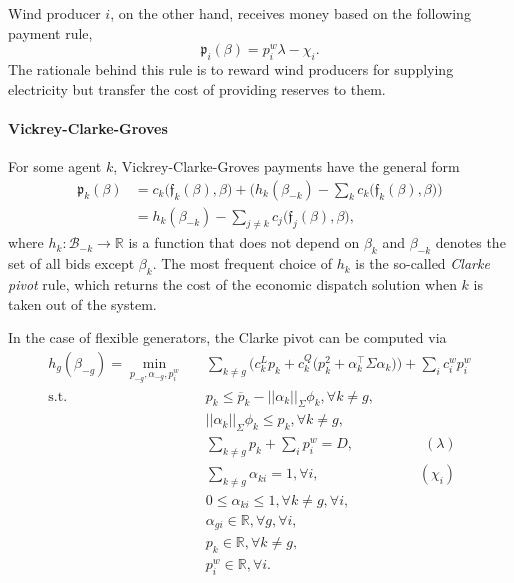 \documentclass{article}
\begin{document}
Wind producer $i$, on the other hand, receives money based on the following payment rule,
\begin{equation*}
\mathfrak{p}_i(\beta) = p_i^w \lambda - \chi_i.
\end{equation*}
The rationale behind this rule is to reward wind producers for supplying electricity but transfer the cost of providing reserves to them.

\paragraph{Vickrey-Clarke-Groves}

For some agent $k$, Vickrey-Clarke-Groves payments have the general form
\begin{align*}
\mathfrak{p}_k(\beta) &= c_k\big(\mathfrak{f}_k(\beta), \beta \big) + \Big(h_k(\beta_{-k}) - \sum_{k} c_k\big(\mathfrak{f}_k(\beta), \beta \big) \Big)\\
&= h_k(\beta_{-k}) - \sum_{j \ne k} c_j\big(\mathfrak{f}_j(\beta), \beta\big),
\end{align*}
where $h_k: \mathcal{B}_{-k} \rightarrow \mathbb{R}$ is a function that does not depend on $\beta_k$ and $\beta_{-k}$ denotes the set of all bids except $\beta_k$. The most frequent choice of $h_k$ is the so-called \textit{Clarke pivot} rule, which returns the cost of the economic dispatch solution when $k$ is taken out of the system.

In the case of flexible generators, the Clarke pivot can be computed via
\begin{align*}
h_g(\beta_{-g}) = \underset{p_{-g}, \alpha_{-g}, p_i^w}{\min} \hspace{10pt} & \sum_{k \ne g} \Big(c_k^L p_k+ c_k^Q \big(p_k ^2 + \alpha_k^\top \Sigma \alpha_k\big)\Big) + \sum_i c_i^w p_i^w \\
\mbox{s.t. } & p_k \le \overline{p}_k - ||\alpha_k||_{\Sigma} \phi_k,\forall k \ne g,\\
& ||\alpha_k||_{\Sigma} \phi_k \le p_k,\forall k \ne g,\\
& \sum_{k \ne g} p_k + \sum_i p_i^w = D, \hspace{60pt} (\lambda)\\
& \sum_{k \ne g} \alpha_{ki} = 1, \forall i, \hspace{85pt} (\chi_i)\\
& 0 \le \alpha_{ki} \le 1, \forall k \ne g, \forall i,\\
& \alpha_{gi} \in \mathbb{R}, \forall g, \forall i,\\
& p_k \in \mathbb{R}, \forall k \ne g,\\
& p_i^w \in \mathbb{R}, \forall i.
\end{align*}
\end{document}

